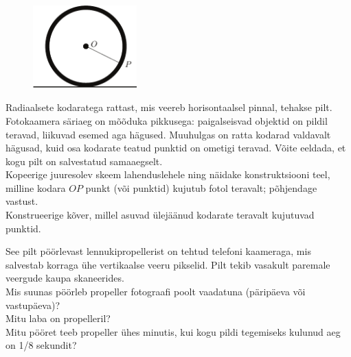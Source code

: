 \documentclass[10pt, twoside]{article}
\begin{document}
{
\begin{figure}
	\vspace{-10pt}
	\includegraphics[width=40mm]{2011-lahg-10-kodar.pdf}
\end{figure}
Radiaalsete kodaratega rattast, mis veereb horisontaalsel pinnal, tehakse pilt.
Fotokaamera säriaeg on mõõduka pikkusega: paigalseisvad objektid on pildil teravad, 
liikuvad esemed aga hägused. Muuhulgas on ratta kodarad valdavalt hägusad, 
kuid osa kodarate teatud punktid on ometigi teravad. Võite eeldada, et kogu pilt on 
salvestatud samaaegselt. 
\\
\osa Kopeerige juuresolev skeem lahenduslehele ning näidake konstruktsiooni teel, 
milline kodara $OP$ punkt (või punktid) kujutub fotol teravalt; põhjendage vastust.\\
\osa Konstrueerige kõver, millel asuvad ülejäänud kodarate teravalt kujutuvad punktid.
\probend
\newpage

\bigskip


See pilt pöörlevast lennukipropellerist on tehtud telefoni kaameraga, mis salvestab korraga ühe vertikaalse veeru pikselid. Pilt tekib vasakult paremale veergude kaupa skaneerides.\\
\osa Mis suunas pöörleb propeller fotograafi poolt vaadatuna (päripäeva või vastupäeva)?\\
\osa Mitu laba on propelleril?\\
\osa Mitu pööret teeb propeller ühes minutis, kui kogu pildi tegemiseks kulunud aeg on 1/8 sekundit?\\

}
\end{document}
